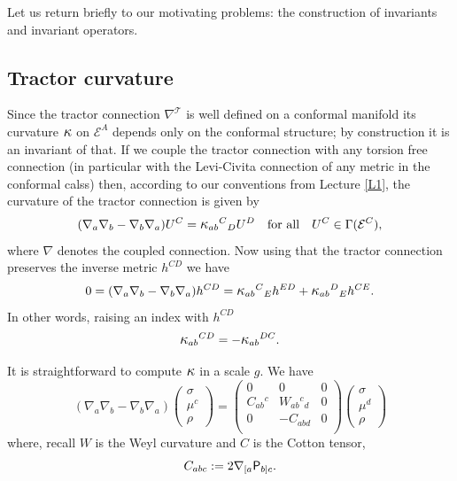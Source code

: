 \documentclass[a4paper,12pt]{amsart}
\newcommand{\kappal}{\mbox{\large{$\kappa$}}}
\def\Cal{\mathcal}
\newcommand{\V}{\mbox{\sf P}}
\newcommand{\ce}{{\Cal E}}
\newcommand{\cT}{{\mathcal T}}
\newcommand{\si}{\sigma}
\theoremstyle{remark}
\begin{document}
Let us return briefly to our motivating problems: the construction of
invariants and invariant operators. 

\subsection{Tractor curvature}\label{Tcurv}


Since the tractor connection $\nabla^\cT$ is well defined on a
conformal manifold its curvature $\kappal$  on $\ce^A$ depends only on
the conformal structure;  by construction it is an invariant of
that. 
If we couple the tractor connection with any torsion free connection (in particular with the Levi-Civita connection of any metric in the conformal calss) then, according to our conventions from Lecture
\ref{L1}, the curvature of the tractor connection is given by
$$
(\nabla_a\nabla_b-\nabla_b\nabla_a) U^C={\kappal}_{ab}{}^C{}_D U^D 
\quad \mbox{for all} \quad U^C \in \Gamma(\ce^C) ,
$$
where $\nabla$ denotes the coupled connection.  Now using that
the tractor connection preserves the inverse metric $h^{CD}$ we have
$$
0=(\nabla_a\nabla_b-\nabla_b\nabla_a)h^{CD}
= {\kappal}_{ab}{}^C{}_Eh^{ED}+{\kappal}_{ab}{}^D{}_Eh^{CE}.
$$
In other words, raising an index with $h^{CD}$ 
\begin{equation}\label{kskew}
{\kappal}_{ab}{}^{CD}=-{\kappal}_{ab}{}^{DC} .
\end{equation}


It is straightforward to compute $\kappal$ in a scale $g$. We have 
\begin{equation}\label{curvform}
(\nabla_a\nabla_b-\nabla_b\nabla_a) \left(\begin{array}{c} \si\\
\mu^c\\ 
\rho
\end{array}\right) =\left(\begin{array}{ccc} 0 & 0 & 0 \\
C_{ab}{}^c & W_{ab}{}^c{}_d & 0 \\ 
0 & -C_{abd} & 0 \\
\end{array}\right) \left(\begin{array}{c} \si\\
\mu^d\\ 
\rho
\end{array}\right)
\end{equation}
where, recall $W$ is the Weyl curvature and $C$ is the Cotton tensor,
 $$
 C_{abc}:= 2\nabla_{[a}\V_{b]c} .
 $$
\end{document}
